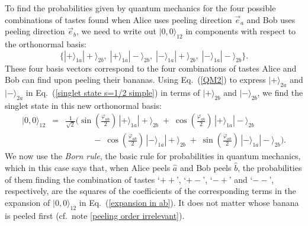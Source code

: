 To find the probabilities given by quantum mechanics for the four possible combinations of tastes found when Alice uses peeling direction $\vec{e}_a$  and Bob uses peeling direction $\vec{e}_b$, we need to write out $| 0, 0 \rangle_{12}$ in components with respect to the orthonormal basis:
\begin{equation}
\Big\{ |+ \rangle_{1a} |+ \rangle_{2b}, \; |+ \rangle_{1a} |- \rangle_{2b}, \; | - \rangle_{1a} | + \rangle_{2b}, \; |- \rangle_{1a} |- \rangle_{2b} \Big\}.
\label{QM4}
\end{equation}
These four basis vectors correspond to the four combinations of tastes Alice and Bob can find upon peeling their bananas. Using Eq.\ (\ref{QM2}) to express $|+ \rangle_{2a}$ and $|- \rangle_{2a}$ in Eq.\ (\ref{singlet state s=1/2 simple}) in terms of $|+ \rangle_{2b}$ and $|- \rangle_{2b}$, we find the singlet state in this new orthonormal basis:
\begin{eqnarray}
|0, 0 \rangle_{12}  & \! \! = \! \! & \frac{1}{\sqrt{2}} \Big( \sin{\! \left( \frac{\varphi_{ab}}{2} \right)} \, |+ \rangle_{1a}  |+ \rangle_{2b}  
\; + \;   \cos{\! \left( \frac{\varphi_{ab}}{2} \right)} \, |+ \rangle_{1a} |- \rangle_{2b} \nonumber \\
 &  & \quad \quad \quad \; - \;   \cos{\! \left( \frac{\varphi_{ab}}{2} \right)} \, | -  \rangle_{1a} | + \rangle_{2b}  
\; + \;   \sin{\! \left( \frac{\varphi_{ab}}{2} \right)} \, |-  \rangle_{1a} |- \rangle_{2b} \Big).
\label{expansion in ab}
\end{eqnarray}
We now use the \emph{Born rule}, the basic rule for probabilities in quantum mechanics, which in this case says that, when Alice peels $\hat{a}$ and Bob peels $\hat{b}$, the probabilities of them finding the combination of tastes `$++$', `$+-$', `$-+$' and `$--$', respectively, are the squares of the coefficients of the corresponding terms in the expansion of $| 0, 0 \rangle_{12}$ in Eq.\ (\ref{expansion in ab}).  It does not matter whose banana is peeled first (cf.\ note \ref{peeling order irrelevant}).


